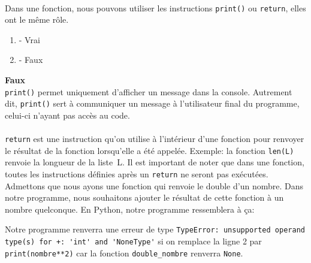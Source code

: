 \begin{Exercice}[2 minutes]\\
Dans une fonction, nous pouvons utiliser les instructions \lstinline{print()} ou \lstinline{return}, elles ont le même rôle.
\begin{enumerate}
    \item - Vrai
    \item - Faux
\end{enumerate}
\begin{solution}
    \textbf{Faux}\\
    \lstinline{print()} permet uniquement d'afficher un message dans la console. Autrement dit, \lstinline{print()} sert à communiquer un message à l'utilisateur final du programme, celui-ci n'ayant pas accès au code.\\\\
    \lstinline{return} est une instruction qu'on utilise à l'intérieur d'une fonction pour renvoyer le résultat de la fonction lorsqu'elle a été appelée. Exemple: la fonction \lstinline{len(L)} renvoie la longueur de la liste~L. Il est important de noter que dans une fonction, toutes les instructions définies après un \lstinline{return} ne seront pas exécutées.\\

    Admettons que nous ayons une fonction qui renvoie le double d'un nombre. Dans notre programme, nous souhaitons ajouter le résultat de cette fonction à un nombre quelconque.
    En Python, notre programme ressemblera à ça:
    

    Notre programme renverra une erreur de type \lstinline{TypeError: unsupported operand type(s) for +: 'int' and 'NoneType'} si on remplace la ligne 2 par \lstinline{print(nombre**2)} car la fonction \lstinline{double_nombre} renverra \lstinline{None}.
\end{solution}
\end{Exercice}


